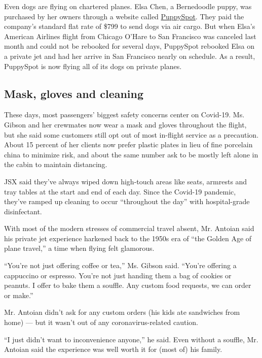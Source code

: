 Even dogs are flying on chartered planes. Elsa Chen, a Bernedoodle
puppy, was purchased by her owners through a website called
\href{https://www.puppyspot.com/}{PuppySpot}. They paid the company's
standard flat rate of \$799 to send dogs via air cargo. But when Elsa's
American Airlines flight from Chicago O'Hare to San Francisco was
canceled last month and could not be rebooked for several days,
PuppySpot rebooked Elsa on a private jet and had her arrive in San
Francisco nearly on schedule. As a result, PuppySpot is now flying all
of its dogs on private planes.

\hypertarget{mask-gloves-and-cleaning}{%
\subsection{Mask, gloves and cleaning}\label{mask-gloves-and-cleaning}}

These days, most passengers' biggest safety concerns center on Covid-19.
Ms. Gibson and her crewmates now wear a mask and gloves throughout the
flight, but she said some customers still opt out of most in-flight
service as a precaution. About 15 percent of her clients now prefer
plastic plates in lieu of fine porcelain china to minimize risk, and
about the same number ask to be mostly left alone in the cabin to
maintain distancing.

JSX said they've always wiped down high-touch areas like seats, armrests
and tray tables at the start and end of each day. Since the Covid-19
pandemic, they've ramped up cleaning to occur ``throughout the day''
with hospital-grade disinfectant.

With most of the modern stresses of commercial travel absent, Mr.
Antoian said his private jet experience harkened back to the 1950s era
of ``the Golden Age of plane travel,'' a time when flying felt
glamorous.

``You're not just offering coffee or tea,'' Ms. Gibson said. ``You're
offering a cappuccino or espresso. You're not just handing them a bag of
cookies or peanuts. I offer to bake them a souffle. Any custom food
requests, we can order or make.''

Mr. Antoian didn't ask for any custom orders (his kids ate sandwiches
from home) --- but it wasn't out of any coronavirus-related caution.

``I just didn't want to inconvenience anyone,'' he said. Even without a
souffle, Mr. Antoian said the experience was well worth it for (most of)
his family.

